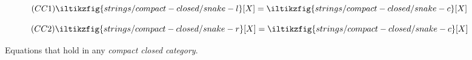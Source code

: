 \begin{figure}
    \centering
    \begin{minipage}{0.29\textwidth}
        \begin{equation}
            \tag{\(\mathsf{CC1}\)}
            \iltikzfig{strings/compact-closed/snake-l}[X]
            =
            \iltikzfig{strings/compact-closed/snake-c}[X]
            \label{eq:snake-l}
        \end{equation}
    \end{minipage}
    \begin{minipage}{0.29\textwidth}
        \begin{equation}
            \tag{\(\mathsf{CC2}\)}
            \iltikzfig{strings/compact-closed/snake-r}[X]
            =
            \iltikzfig{strings/compact-closed/snake-c}[X]
            \label{eq:snake-r}
        \end{equation}
    \end{minipage}
    \caption{
        Equations that hold in any \emph{compact closed category}.
    }
    \label{fig:ccc-axioms}
\end{figure}